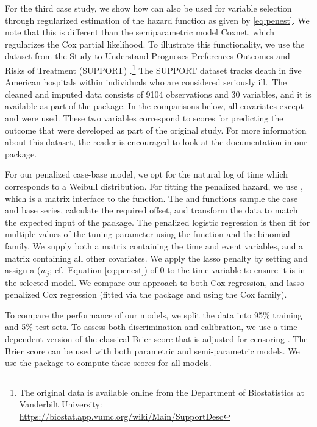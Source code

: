 For the third case study, we show how  can also be used
for variable selection through regularized estimation of the hazard
function as given by \eqref{eq:penest}. We note that this is different
than the semiparametric model Coxnet, which regularizes the Cox partial
likelihood. To illustrate this functionality, we use the dataset from
the Study to Understand Prognoses Preferences Outcomes and Risks of
Treatment (SUPPORT)
\citep{knaus1995support}.\footnote{The original data is available online from the Department of Biostatistics at Vanderbilt University: \url{https://biostat.app.vumc.org/wiki/Main/SupportDesc}}
The SUPPORT dataset tracks death in five American hospitals within
individuals who are considered seriously ill.~The cleaned and imputed
data consists of 9104 observations and 30 variables, and it is available
as part of the  package. In the comparisons below, all
covariates except  and  were used. These two
variables correspond to scores for predicting the outcome that were
developed as part of the original study. For more information about this
dataset, the reader is encouraged to look at the documentation in our
package.

For our penalized case-base model, we opt for the natural log of time
which corresponds to a Weibull distribution. For fitting the penalized
hazard, we use , which is a matrix interface
to the  function. The  and
 functions sample the case and base series,
calculate the required offset, and transform the data to match the
expected input of the  package. The penalized logistic
regression is then fit for multiple values of the tuning parameter using
the function  and the binomial family. We supply
both a matrix  containing the time and event variables, and a
matrix  containing all other covariates. We apply the lasso
penalty by setting  and assign a 
(\(w_j\); cf.~Equation \ref{eq:penest}) of 0 to the time variable to
ensure it is in the selected model. We compare our approach to both Cox
regression, and lasso penalized Cox regression (fitted via the
 package and using the Cox family).

To compare the performance of our models, we split the data into 95\%
training and 5\% test sets. To assess both discrimination and
calibration, we use a time-dependent version of the classical Brier
score that is adjusted for censoring \citep{graf1999ass}. The Brier
score can be used with both parametric and semi-parametric models. We
use the  package to compute these scores for all
models.

